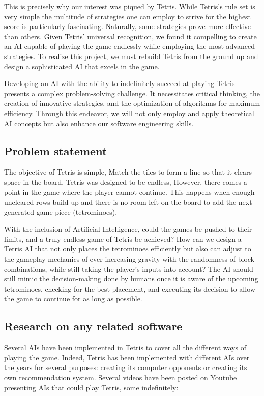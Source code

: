 \documentclass[conference]{IEEEtran}
\begin{document}
This is precisely why our interest was piqued by Tetris. While Tetris's rule set is very simple the multitude of strategies one can employ to strive for the highest score is particularly fascinating. Naturally, some strategies prove more effective than others. Given Tetris' universal recognition, we found it compelling to create an AI capable of playing the game endlessly while employing the most advanced strategies. To realize this project, we must rebuild Tetris from the ground up and design a sophisticated AI that excels in the game.

Developing an AI with the ability to indefinitely succeed at playing Tetris presents a complex problem-solving challenge. It necessitates critical thinking, the creation of innovative strategies, and the optimization of algorithms for maximum efficiency. Through this endeavor, we will not only employ and apply theoretical AI concepts but also enhance our software engineering skills.

\subsection*{Problem statement}
The objective of Tetris is simple, Match the tiles to form a line so that it clears space in the board. Tetris was designed to be endless, However, there comes a point in the game where the player cannot continue. This happens when enough uncleared rows build up and there is no room left on the board to add the next generated game piece (tetrominoes).

With the inclusion of Artificial Intelligence, could the games be pushed to their limits, and a truly endless game of Tetris be achieved? How can we design a Tetris AI that not only places the tetrominoes efficiently but also can adjust to the gameplay mechanics of ever-increasing gravity with the randomness of block combinations, while still taking the player’s inputs into account? The AI should still mimic the decision-making done by humans once it is aware of the upcoming tetrominoes, checking for the best placement, and executing its decision to allow the game to continue for as long as possible.

\subsection*{Research on any related software}
Several AIs have been implemented in Tetris to cover all the different ways of playing the game. Indeed, Tetris has been implemented with different AIs over the years for several purposes: creating its computer opponents or creating its own recommendation system. 
Several videos have been posted on Youtube presenting AIs that could play Tetris, some indefinitely:
\end{document}
